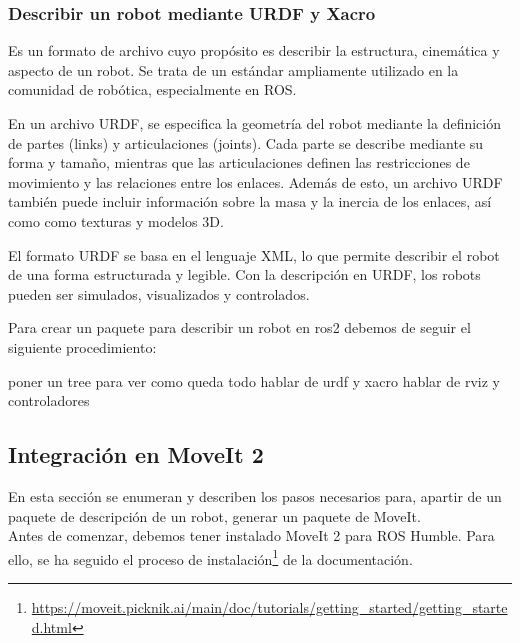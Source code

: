 \subsubsection{Describir un robot mediante \ac{URDF} y Xacro}
Es un formato de archivo cuyo propósito es describir la estructura, cinemática y aspecto de un robot.  
Se trata de un estándar ampliamente utilizado en la comunidad de robótica, especialmente en \ac{ROS}.

En un archivo URDF, se especifica la geometría del robot mediante la definición de partes (links) y articulaciones (joints). 
Cada parte se describe mediante su forma y tamaño, mientras que las articulaciones definen las restricciones de movimiento y las relaciones entre los enlaces.
Además de esto, un archivo URDF también puede incluir información sobre la masa y la inercia de los enlaces, así como como texturas y modelos 3D.

El formato URDF se basa en el lenguaje \ac{XML}, lo que permite describir el robot de una forma estructurada y legible. Con la descripción 
en URDF, los robots pueden ser simulados, visualizados y controlados.

Para crear un paquete para describir un robot en ros2 debemos de seguir el siguiente procedimiento:



poner un tree para ver como queda todo 
hablar de urdf y xacro
hablar de rviz y controladores





\newpage
\subsection{Integración en MoveIt 2}
\noindent En esta sección se enumeran y describen los pasos necesarios para, apartir de un paquete de descripción de un robot, generar 
un paquete de MoveIt.
\\
Antes de comenzar, debemos tener instalado MoveIt 2 para ROS Humble. Para ello, se ha seguido el proceso de 
instalación\footnote{\url{https://moveit.picknik.ai/main/doc/tutorials/getting_started/getting_started.html}} de la documentación.
\\

